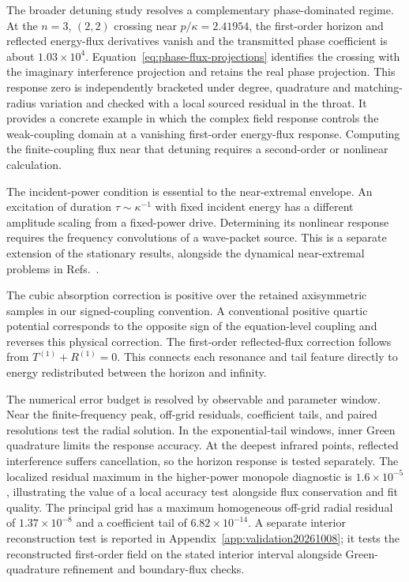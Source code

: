\documentclass[aps,prd,twocolumn,10pt,nofootinbib,superscriptaddress,floatfix]{revtex4-2}
\begin{document}
The broader detuning study resolves a complementary phase-dominated regime.
At the $n=3$, $(2,2)$ crossing near $p/\kappa=2.41954$,
the first-order horizon and reflected energy-flux derivatives vanish
and the transmitted phase coefficient is about $1.03\times10^4$.
Equation~\eqref{eq:phase-flux-projections} identifies the crossing with
the imaginary interference projection and retains the real phase
projection.  This response zero is independently bracketed under degree,
quadrature and matching-radius variation and checked with a local sourced
residual in the throat.  It provides a concrete example in which the
complex field response controls the weak-coupling domain at a vanishing
first-order energy-flux response.  Computing the finite-coupling flux
near that detuning requires a second-order or nonlinear calculation.

The incident-power condition is essential to the near-extremal envelope.
An excitation of duration $\tau\sim\kappa^{-1}$ with fixed incident
energy has a different amplitude scaling from a fixed-power drive.
Determining its nonlinear response requires the frequency convolutions
of a wave-packet source.  This is a separate extension of the stationary
results, alongside the dynamical near-extremal problems in
Refs.~\cite{GrallaTransient2016,GrallaCritical2018,IulianoWeather2025}.

The cubic absorption correction is positive over the retained axisymmetric
samples in our signed-coupling convention.  A
conventional positive quartic potential corresponds to the opposite sign of
the equation-level coupling and reverses this physical correction.
The first-order reflected-flux correction follows from
$T^{(1)}+R^{(1)}=0$.  This connects each resonance and tail feature directly
to energy redistributed between the horizon and infinity.

The numerical error budget is resolved by observable and parameter window.
Near the
finite-frequency peak, off-grid residuals, coefficient tails, and paired
resolutions test the radial solution.  In the exponential-tail windows,
inner Green quadrature limits the response accuracy.  At the deepest
infrared points, reflected interference suffers cancellation, so the
horizon response is tested separately.  The localized residual maximum in
the higher-power monopole diagnostic is $1.6\times10^{-5}$, illustrating
the value of a local accuracy test alongside flux conservation and fit
quality.  The principal grid has a maximum homogeneous off-grid radial
residual of $1.37\times10^{-8}$ and a coefficient tail of
$6.82\times10^{-14}$.  A separate
interior reconstruction test is reported in Appendix~\ref{app:validation20261008};
it tests the reconstructed first-order field on the stated interior interval
alongside Green-quadrature refinement and boundary-flux checks.
\end{document}
